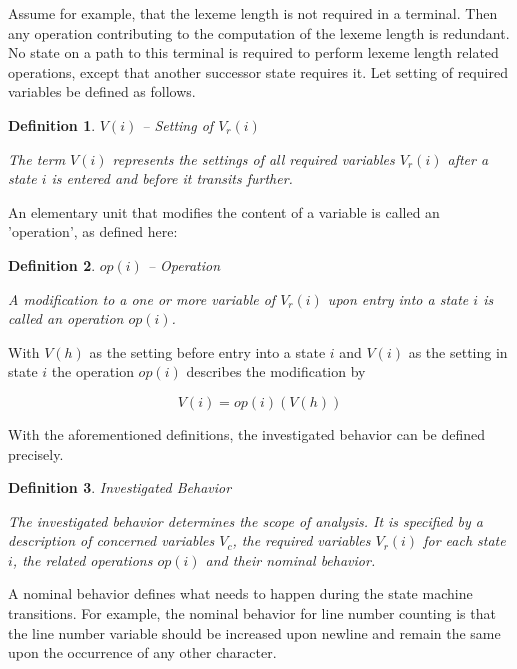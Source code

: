 \documentclass[12pt,a4paper]{scrartcl}
\theoremstyle{break}
\newtheorem{definition}{Definition}
\begin{document}
Assume for example, that the lexeme length is not required in a terminal. Then
any operation contributing to the computation of the lexeme length is
redundant.  No state on a path to this terminal is required to perform lexeme
length related operations, except that another successor state requires it.
Let setting of required variables be defined as follows.

\begin{definition}
$V(i)$ -- Setting of $V_r(i)$

The term $V(i)$ represents the settings of all required variables $V_r(i)$
after a state $i$ is entered and before it transits further. 
\end{definition}
    
An elementary unit that modifies the content of a variable is called an
'operation', as defined here:

\begin{definition}
$op(i)$ -- Operation 

A modification to a one or more variable of $V_r(i)$ upon entry into a state
$i$ is called an operation $op(i)$. 
\end{definition}
    
With $V(h)$ as the setting before entry into a state $i$ and $V(i)$ as the
setting in state $i$ the operation $op(i)$ describes the modification by 

\begin{equation}
\label{eq:operation}
                         V(i) = op(i)(V(h))
\end{equation}

With the aforementioned definitions, the investigated behavior can be defined
precisely.

\begin{definition}
Investigated Behavior 

The investigated behavior determines the scope of analysis. It is
specified by a description of concerned variables $V_c$, the required
variables $V_r(i)$ for each state $i$, the related operations $op(i)$ and
their nominal behavior.
\end{definition}
    
A nominal behavior defines what needs to happen during the state machine
transitions.  For example, the nominal behavior for line number counting is
that the line number variable should be increased upon newline and remain the
same upon the occurrence of any other character. 

%
\end{document}
